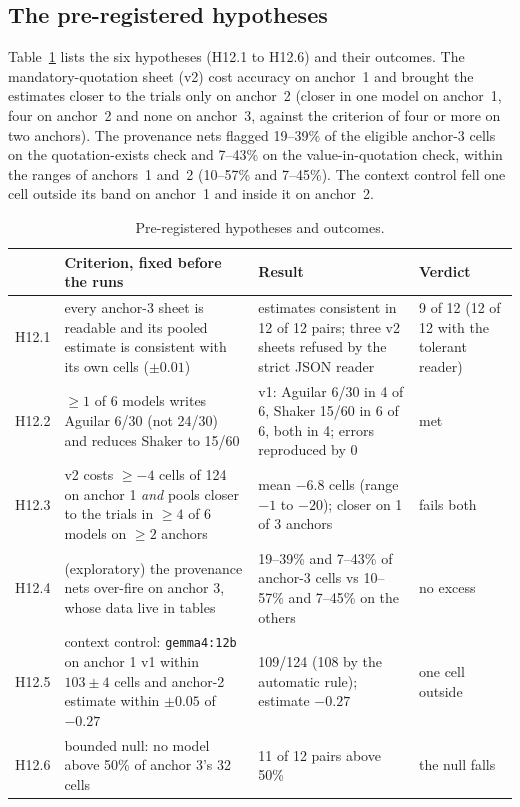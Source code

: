 \documentclass[11pt]{article}
\begin{document}
\subsection{The pre-registered hypotheses}
Table~\ref{tab:hyp} lists the six hypotheses (H12.1 to H12.6) and their outcomes. The mandatory-quotation sheet (v2) cost accuracy on anchor~1 and brought the estimates closer to the trials only on anchor~2 (closer in one model on anchor~1, four on anchor~2 and none on anchor~3, against the criterion of four or more on two anchors). The provenance nets flagged 19--39\% of the eligible anchor-3 cells on the quotation-exists check and 7--43\% on the value-in-quotation check, within the ranges of anchors~1 and~2 (10--57\% and 7--45\%). The context control fell one cell outside its band on anchor~1 and inside it on anchor~2.

\begin{table}[!htbp]
\centering\footnotesize
\caption{Pre-registered hypotheses and outcomes.}
\label{tab:hyp}
\setlength{\tabcolsep}{3pt}
\begin{tabular}{@{}p{0.9cm}p{5.8cm}p{6.0cm}p{1.9cm}@{}}
\toprule
 & Criterion, fixed before the runs & Result & Verdict \\
\midrule
H12.1 & every anchor-3 sheet is readable and its pooled estimate is consistent with its own cells ($\pm0.01$) & estimates consistent in 12 of 12 pairs; three v2 sheets refused by the strict JSON reader & 9 of 12 (12 of 12 with the tolerant reader) \\
H12.2 & $\geq 1$ of 6 models writes Aguilar 6/30 (not 24/30) and reduces Shaker to 15/60 & v1: Aguilar 6/30 in 4 of 6, Shaker 15/60 in 6 of 6, both in 4; errors reproduced by 0 & met \\
H12.3 & v2 costs $\geq -4$ cells of 124 on anchor 1 \emph{and} pools closer to the trials in $\geq 4$ of 6 models on $\geq 2$ anchors & mean $-6.8$ cells (range $-1$ to $-20$); closer on 1 of 3 anchors & fails both \\
H12.4 & (exploratory) the provenance nets over-fire on anchor 3, whose data live in tables & 19--39\% and 7--43\% of anchor-3 cells vs 10--57\% and 7--45\% on the others & no excess \\
H12.5 & context control: \texttt{gemma4:12b} on anchor 1 v1 within $103 \pm 4$ cells and anchor-2 estimate within $\pm0.05$ of $-0.27$ & 109/124 (108 by the automatic rule); estimate $-0.27$ & one cell outside \\
H12.6 & bounded null: no model above 50\% of anchor 3's 32 cells & 11 of 12 pairs above 50\% & the null falls \\
\bottomrule
\end{tabular}
\end{table}
\end{document}
